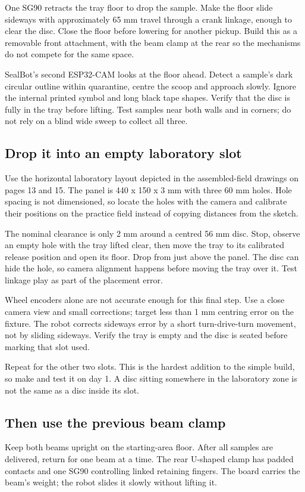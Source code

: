 \documentclass[10pt,a4paper]{article}
\begin{document}
One SG90 retracts the tray floor to drop the sample. Make the floor slide sideways with approximately 65 mm travel through a crank linkage, enough to clear the disc. Close the floor before lowering for another pickup. Build this as a removable front attachment, with the beam clamp at the rear so the mechanisms do not compete for the same space.

SealBot's second ESP32-CAM looks at the floor ahead. Detect a sample's dark circular outline within quarantine, centre the scoop and approach slowly. Ignore the internal printed symbol and long black tape shapes. Verify that the disc is fully in the tray before lifting. Test samples near both walls and in corners; do not rely on a blind wide sweep to collect all three.

\subsection{Drop it into an empty laboratory slot}
Use the horizontal laboratory layout depicted in the assembled-field drawings on pages 13 and 15. The panel is 440 x 150 x 3 mm with three 60 mm holes. Hole spacing is not dimensioned, so locate the holes with the camera and calibrate their positions on the practice field instead of copying distances from the sketch.

The nominal clearance is only 2 mm around a centred 56 mm disc. Stop, observe an empty hole with the tray lifted clear, then move the tray to its calibrated release position and open its floor. Drop from just above the panel. The disc can hide the hole, so camera alignment happens before moving the tray over it. Test linkage play as part of the placement error.

Wheel encoders alone are not accurate enough for this final step. Use a close camera view and small corrections; target less than 1 mm centring error on the fixture. The robot corrects sideways error by a short turn-drive-turn movement, not by sliding sideways. Verify the tray is empty and the disc is seated before marking that slot used.

Repeat for the other two slots. This is the hardest addition to the simple build, so make and test it on day 1. A disc sitting somewhere in the laboratory zone is not the same as a disc inside its slot.

\subsection{Then use the previous beam clamp}
Keep both beams upright on the starting-area floor. After all samples are delivered, return for one beam at a time. The rear U-shaped clamp has padded contacts and one SG90 controlling linked retaining fingers. The board carries the beam's weight; the robot slides it slowly without lifting it.
\end{document}
